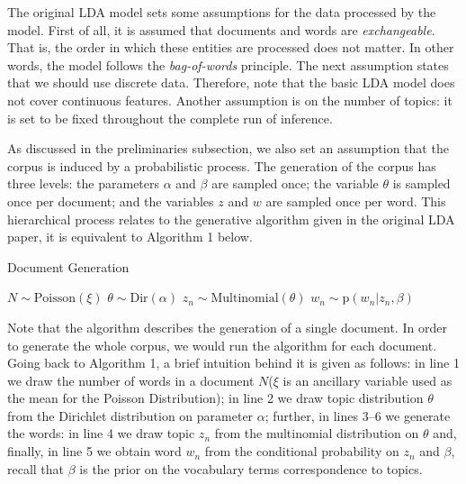 \documentclass{mprop}
\begin{document}
\par The original LDA model sets some assumptions for the data processed by the model. First of all, it is assumed that documents and words are \textit{exchangeable}. That is, the order in which these entities are processed does not matter. In other words, the model follows the \textit{bag-of-words} principle. The next assumption states that we should use discrete data. Therefore, note that the basic LDA model does not cover continuous features. Another assumption is on the number of topics: it is set to be fixed throughout the complete run of inference.  

\par As discussed in the preliminaries subsection, we also set an assumption that the corpus is induced by a probabilistic process. The generation of the corpus has three levels: the parameters $\alpha$ and $\beta$ are sampled once; the variable $\theta$ is sampled once per document; and the variables $z$ and $w$ are sampled once per word. This hierarchical process relates to the generative algorithm given in the original LDA paper, it is equivalent to Algorithm 1 below.
\begin{algorithm}[H]
\caption{Document Generation}
\label{alg:document_generation}
\begin{algorithmic}[1]
\State $N \sim \mbox{Poisson}(\xi)$
\State $\theta \sim \mbox{Dir}(\alpha)$
\State $z_n \sim \mbox{Multinomial}(\theta)$
\State $w_n \sim \mbox{p}(w_n | z_n, \beta)$
\EndFor
\end{algorithmic}
\end{algorithm}
Note that the algorithm describes the generation of a single document. In order to generate the whole corpus, we would run the algorithm for each document. Going back to Algorithm 1, a brief intuition behind it is given as follows: in line 1 we draw the number of words in a document $N$($\xi$ is an ancillary variable used as the mean for the Poisson Distribution); in line 2 we draw topic distribution $\theta$ from the Dirichlet distribution on parameter $\alpha$; further, in lines 3--6 we generate the words: in line 4 we draw topic $z_n$ from the multinomial distribution on $\theta$ and, finally, in line 5 we obtain  word $w_n$ from the conditional probability on $z_n$ and $\beta$, recall that $\beta$ is the prior on the vocabulary terms correspondence to topics.
\end{document}
